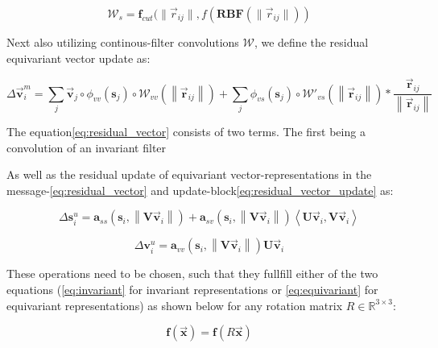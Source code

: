 \begin{equation}
    \mathcal{W}_{s} = \mathbf{f}_{cut}(\lVert \vec{r}_{ij} \rVert, f(\mathbf{RBF}(\lVert \vec{r}_{ij} \rVert))
\end{equation}

Next also utilizing continous-filter convolutions $\mathcal{W}$, we define the residual equivariant vector update as:

\begin{equation}\label{eq:residual_vector}
    \Delta \vec{\mathbf{v}}_{i}^{m}= \sum_{j} \vec{\mathbf{v}}_{j} \circ \phi_{vv}(\mathbf{s}_{j}) \circ \mathcal{W}_{vv} \left ( \left \| \vec{\mathbf{r}}_{ij} \right \| \right ) + \sum_{j} \phi_{vs}(\mathbf{s}_{j}) \circ \mathcal{W}'_{vs} \left ( \left \| \vec{\mathbf{r}}_{ij} \right \| \right ) * \frac{\vec{\mathbf{r}}_{ij}}{\left \|\vec{\mathbf{r}}_{ij} \right \|}
\end{equation}

The equation\ref{eq:residual_vector} consists of two terms. The first being a convolution of an invariant filter

As well as the residual update of equivariant vector-representations in the message-\ref{eq:residual_vector} and update-block\ref{eq:residual_vector_update} as:

\begin{equation}\label{eq:residual_scalar_update}
    \Delta \mathbf{s}_{i}^{u}= \mathbf{a}_{ss} \left ( \mathbf{s}_{i}, \left \| \mathbf{V}\vec{\mathbf{v}}_{i} \right \| \right ) + \mathbf{a}_{sv} \left ( \mathbf{s}_{i}, \left \| \mathbf{V}\vec{\mathbf{v}}_{i} \right \| \right ) \left \langle \mathbf{U} \vec{\mathbf{v}}_{i}, \mathbf{V} \vec{\mathbf{v}}_{i} \right \rangle
\end{equation}

\begin{equation}\label{eq:residual_vector_update}
    \Delta \mathbf{v}_{i}^{u}= \mathbf{a}_{vv} \left ( \mathbf{s}_{i}, \left \| \mathbf{V}\vec{\mathbf{v}}_{i} \right \| \right ) \mathbf{U}\vec{\mathbf{v}}_{i}
\end{equation}

These operations need to be chosen, such that they fullfill either
of the two equations (\ref{eq:invariant} for invariant representations or \ref{eq:equivariant} for equivariant representations)
as shown below for any rotation matrix $R \in \mathbb{R}^{3 \times 3}$:

\begin{equation}\label{eq:invariant}
    \mathbf{f}(\vec{\mathbf{x}}) = \mathbf{f}(R \vec{\mathbf{x}})
\end{equation}

